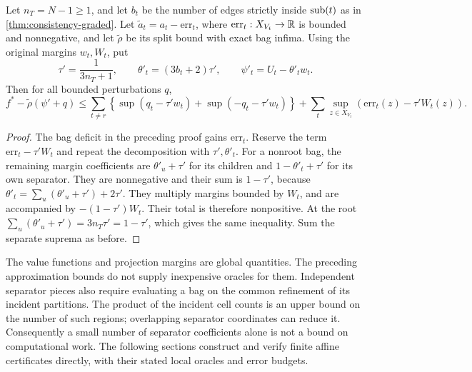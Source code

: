 \begin{proposition}
\label{prop:consistency-bag-errors}
Let $n_T=N-1\ge1$, and let $b_t$ be the number of edges strictly inside
$\operatorname{sub}(t)$ as in \cref{thm:consistency-graded}.
Let $\widetilde a_t=a_t-\mathrm{err}_t$, where
$\mathrm{err}_t:X_{V_t}\to\mathbb R$ is bounded and nonnegative, and let
$\widetilde\rho$ be its split bound with exact bag infima.  Using the
original margins $w_t,W_t$, put
\[
 \tau'=\frac1{3n_T+1},\qquad
 \theta'_t=(3b_t+2)\tau',\qquad \psi'_t=U_t-\theta'_tw_t.
\]
Then for all bounded perturbations $q$,
\begin{equation}
\label{eq:consistency-bag-errors}
 f^*-\widetilde\rho(\psi'+q)
 \le\sum_{t\ne r}\left\{\sup(q_t-\tau'w_t)+\sup(-q_t-\tau'w_t)\right\}
       +\sum_t\sup_{z\in X_{V_t}}\left(\mathrm{err}_t(z)-\tau'W_t(z)\right).
\end{equation}
\end{proposition}

\begin{proof}
The bag deficit in the preceding proof gains $\mathrm{err}_t$.
Reserve the term $\mathrm{err}_t-\tau'W_t$ and repeat the decomposition
with $\tau',\theta'_t$.  For a nonroot bag, the remaining margin
coefficients are $\theta'_u+\tau'$ for its children and
$1-\theta'_t+\tau'$ for its own separator.  They are nonnegative and
their sum is $1-\tau'$, because
$\theta'_t=\sum_u(\theta'_u+\tau')+2\tau'$.
They multiply margins bounded by $W_t$, and are accompanied by
$-(1-\tau')W_t$.  Their total is therefore nonpositive.
At the root $\sum_u(\theta'_u+\tau')=3n_T\tau'=1-\tau'$, which gives the
same inequality.  Sum the separate suprema as before.
\end{proof}

\begin{remark}
\label{rem:consistency-scope}
The value functions and projection margins are global quantities.
The preceding approximation bounds do not supply inexpensive oracles
for them.  Independent separator pieces also require evaluating a bag on
the common refinement of its incident partitions.  The product of the
incident cell counts is an upper bound on the number of such regions;
overlapping separator coordinates can reduce it.  Consequently a small
number of separator coefficients alone is not a bound on computational
work.  The following sections construct and verify finite affine
certificates directly, with their stated local oracles and error budgets.
\end{remark}
